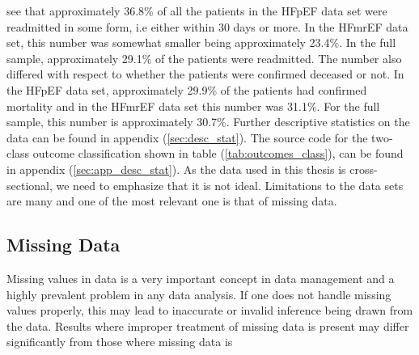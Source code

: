 \documentclass[../thesis.tex]{subfiles}
\begin{document}
\vspace*{-0,5cm}\noindent see that approximately 36.8\% of all the patients in the HFpEF data set were readmitted in some form, i.e either within 30 days or more. In the HFmrEF data set, this number was somewhat smaller being approximately 23.4\%. In the full sample, approximately 29.1\% of the patients were readmitted. The number also differed with respect to whether the patients were confirmed deceased or not. In the HFpEF data set, approximately 29.9\% of the patients had confirmed mortality and in the HFmrEF data set this number was 31.1\%. For the full sample, this number is approximately 30.7\%. Further descriptive statistics on the data can be found in appendix (\ref{sec:desc_stat}). The source code for the two-class outcome classification shown in table (\ref{tab:outcomes_class}), can be found in appendix (\ref{sec:app_desc_stat}). As the data used in this thesis is cross-sectional, we need to emphasize that it is not ideal. Limitations to the data sets are many and one of the most relevant one is that of missing data. 

\subsection{Missing Data}
\label{subsec:miss_data}

\noindent Missing values in data is a very important concept in data management and a highly prevalent problem in any data analysis. If one does not handle missing values properly, this may lead to inaccurate or invalid inference being drawn from the data. Results where improper treatment of missing data is present may differ significantly from those where missing data is  


\end{document}
